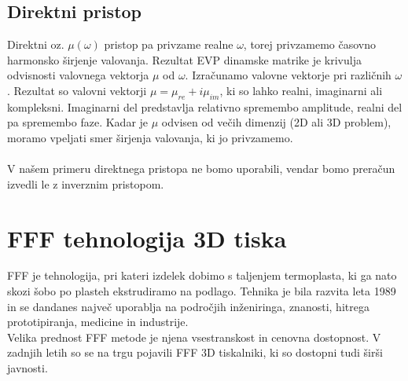 \documentclass[12pt]{report}
\begin{document}
\subsection{Direktni pristop}
Direktni oz. $\mu(\omega)$ pristop pa privzame realne $\omega$, torej privzamemo časovno harmonsko širjenje valovanja. Rezultat \ac{EVP} dinamske matrike je krivulja odvisnosti valovnega vektorja $\mu$
od $\omega$. Izračunamo valovne vektorje pri različnih $\omega$. Rezultat so valovni vektorji $\mu = \mu_{re} + i\mu_{im}$, ki so lahko realni, imaginarni ali kompleksni. Imaginarni del predstavlja relativno spremembo amplitude, realni del pa
spremembo faze. \cite{vanbelle, kosir} Kadar je $\mu$ odvisen od večih dimenzij (2D ali 3D problem), moramo vpeljati smer širjenja valovanja, ki jo privzamemo.
\\
\\
V našem primeru direktnega pristopa ne bomo uporabili, vendar bomo preračun izvedli le z inverznim pristopom.

\section{FFF tehnologija 3D tiska}
\ac{FFF} je tehnologija, pri kateri izdelek dobimo s taljenjem termoplasta, ki ga nato skozi šobo po plasteh ekstrudiramo na podlago. Tehnika je bila razvita leta 1989 in se dandanes
največ uporablja na področjih inženiringa, znanosti, hitrega prototipiranja, medicine in industrije. \cite{fff_article}
\\
Velika prednost \ac{FFF} metode je njena vsestranskost in cenovna dostopnost. V zadnjih letih so se na trgu pojavili \ac{FFF} 3D tiskalniki, ki so dostopni tudi 
širši javnosti. 
\end{document}
